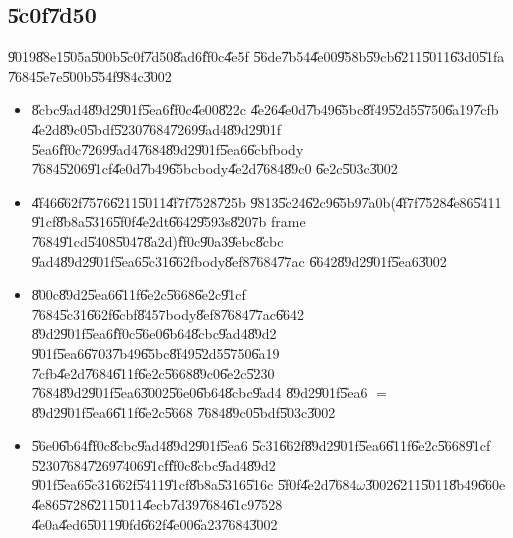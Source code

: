 \documentclass[12pt,a4paper]{article}
\begin{document}
\bigskip

\subsection{\U{5c0f}\U{7d50}}

\U{9019}\U{88e1}\U{505a}\U{500b}\U{5c0f}\U{7d50}\U{8ad6}\U{ff0c}\U{4e5f}%
\U{56de}\U{7b54}\U{4e00}\U{958b}\U{59cb}\U{6211}\U{5011}\U{63d0}\U{51fa}%
\U{7684}\U{5e7e}\U{500b}\U{554f}\U{984c}\U{3002}

\begin{itemize}
\item \U{8cbc}\U{9ad4}\U{89d2}\U{901f}\U{5ea6}\U{ff0c}\U{4e00}\U{822c}%
\U{4e26}\U{4e0d}\U{7b49}\U{65bc}\U{8f49}\U{52d5}\U{5750}\U{6a19}\U{7cfb}%
\U{4e2d}\U{89c0}\U{5bdf}\U{5230}\U{7684}\U{7269}\U{9ad4}\U{89d2}\U{901f}%
\U{5ea6}\U{ff0c}\U{7269}\U{9ad4}\U{7684}\U{89d2}\U{901f}\U{5ea6}\U{6cbf}body%
\U{7684}\U{5206}\U{91cf}\U{4e0d}\U{7b49}\U{65bc}body\U{4e2d}\U{7684}\U{89c0}%
\U{6e2c}\U{503c}\U{3002}

\item \U{4f46}\U{662f}\U{7576}\U{6211}\U{5011}\U{4f7f}\U{7528}\U{725b}%
\U{9813}\U{5c24}\U{62c9}\U{65b9}\U{7a0b}(\U{4f7f}\U{7528}\U{4e86}\U{5411}%
\U{91cf}\U{8b8a}\U{5316}\U{5f0f}\U{4e2d}t\U{6642}\U{9593}s\U{8207}b frame%
\U{7684}\U{91cd}\U{5408}\U{5047}\U{8a2d})\U{ff0c}\U{90a3}\U{9ebc}\U{8cbc}%
\U{9ad4}\U{89d2}\U{901f}\U{5ea6}\U{5c31}\U{662f}body\U{8ef8}\U{7684}\U{77ac}%
\U{6642}\U{89d2}\U{901f}\U{5ea6}\U{3002}

\item \U{800c}\U{89d2}\U{5ea6}\U{611f}\U{6e2c}\U{5668}\U{6e2c}\U{91cf}%
\U{7684}\U{5c31}\U{662f}\U{6cbf}\U{8457}body\U{8ef8}\U{7684}\U{77ac}\U{6642}%
\U{89d2}\U{901f}\U{5ea6}\U{ff0c}\U{56e0}\U{6b64}\U{8cbc}\U{9ad4}\U{89d2}%
\U{901f}\U{5ea6}\U{6703}\U{7b49}\U{65bc}\U{8f49}\U{52d5}\U{5750}\U{6a19}%
\U{7cfb}\U{4e2d}\U{7684}\U{611f}\U{6e2c}\U{5668}\U{89c0}\U{6e2c}\U{5230}%
\U{7684}\U{89d2}\U{901f}\U{5ea6}\U{3002}\U{56e0}\U{6b64}\U{8cbc}\U{9ad4}%
\U{89d2}\U{901f}\U{5ea6} $=$ \U{89d2}\U{901f}\U{5ea6}\U{611f}\U{6e2c}\U{5668}%
\U{7684}\U{89c0}\U{5bdf}\U{503c}\U{3002}

\item \U{56e0}\U{6b64}\U{ff0c}\U{8cbc}\U{9ad4}\U{89d2}\U{901f}\U{5ea6}%
\U{5c31}\U{662f}\U{89d2}\U{901f}\U{5ea6}\U{611f}\U{6e2c}\U{5668}\U{91cf}%
\U{5230}\U{7684}\U{7269}\U{7406}\U{91cf}\U{ff0c}\U{8cbc}\U{9ad4}\U{89d2}%
\U{901f}\U{5ea6}\U{5c31}\U{662f}\U{5411}\U{91cf}\U{8b8a}\U{5316}\U{516c}%
\U{5f0f}\U{4e2d}\U{7684}$\omega $\U{3002}\U{6211}\U{5011}\U{8b49}\U{660e}%
\U{4e86}\U{5728}\U{6211}\U{5011}\U{4ecb}\U{7d39}\U{7684}\U{61c9}\U{7528}%
\U{4e0a}\U{4ed6}\U{5011}\U{90fd}\U{662f}\U{4e00}\U{6a23}\U{7684}\U{3002}


\end{itemize}
\end{document}
